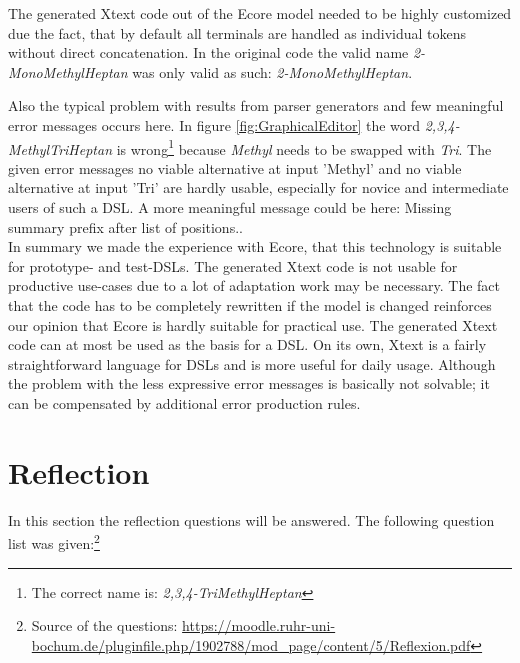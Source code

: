 \documentclass[
fontsize=11pt,
paper=a4,
abstract=true,
numbers=noenddot,
listof=totoc,
bibliography=totoc,
twoside,
open=right,
cleardoublepage=plain,
parskip=half+, %
BCOR=1cm, %
]{scrreprt}
\newcommand{\gerquot}[1]{\glqq#1\grqq}
\begin{document}
The generated Xtext code out of the Ecore model needed to be highly customized due the fact, that by default all terminals are handled as individual tokens without direct concatenation. In the original code the valid name \emph{2-MonoMethylHeptan} was only valid as such: \emph{2-Mono\textvisiblespace Methyl\textvisiblespace Heptan}.

Also the typical problem with results from parser generators and few meaningful error messages occurs here. In figure \ref{fig:GraphicalEditor} the word \emph{2,3,4-MethylTriHeptan} is wrong\footnote{The correct name is: \emph{2,3,4-TriMethylHeptan}} because \emph{Methyl} needs to be swapped with \emph{Tri}. The given error messages \gerquot{no viable alternative at input 'Methyl'} and \gerquot{no viable alternative at input 'Tri'} are hardly usable, especially for novice and intermediate users of such a DSL. A more meaningful message could be here: \gerquot{Missing summary prefix after list of positions.}.\\

In summary we made the experience with Ecore, that this technology is suitable for prototype- and test-DSLs. The generated Xtext code is not usable for productive use-cases due to a lot of adaptation work may be necessary. The fact that the code has to be completely rewritten if the model is changed reinforces our opinion that Ecore is hardly suitable for practical use. The generated Xtext code can at most be used as the basis for a DSL. On its own, Xtext is a fairly straightforward language for DSLs and is more useful for daily usage. Although the problem with the less expressive error messages is basically not solvable; it can be compensated by additional error production rules.



\chapter{Reflection}\label{s:Reflection}
In this section the reflection questions will be answered. The following question list was given:\footnote{Source of the questions: \href{https://moodle.ruhr-uni-bochum.de/pluginfile.php/1902788/mod_page/content/5/Reflexion.pdf}{\url{https://moodle.ruhr-uni-bochum.de/pluginfile.php/1902788/mod_page/content/5/Reflexion.pdf}}}
\end{document}
